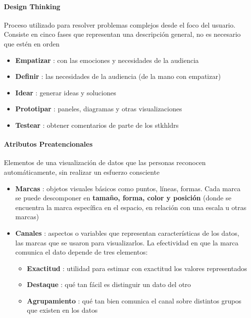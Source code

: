 \paragraph{Design Thinking}
Proceso utilizado para resolver problemas complejos desde el foco del usuario. Consiste en cinco fases que representan una descripción general, no es necesario que estén en orden
\begin{itemize}
    \item {\textbf{Empatizar} : con las emociones y necesidades de la audiencia}
    \item {\textbf{Definir} : las necesidades de la audiencia (de la mano con empatizar)}
    \item {\textbf{Idear} : generar ideas y soluciones} 
    \item {\textbf{Prototipar} : paneles, diagramas y otras visualizaciones}
    \item {\textbf{Testear} : obtener comentarios de parte de los \gls{stkhldrs}}
\end{itemize}

\paragraph{Atributos Preatencionales}
Elementos de una visualización de datos que las personas reconocen automáticamente, sin realizar un esfuerzo consciente
\begin{itemize}
    \item {\textbf{Marcas} : objetos visuales básicos como puntos, líneas, formas. Cada marca se puede descomponer en \textbf{tamaño, forma, color y posición} (donde se encuentra la marca específica en el espacio, en relación con una escala u otras marcas)}
    \item {\textbf{Canales} : aspectos o variables que representan características de los datos, las marcas que se usaron para visualizarlos. La efectividad en que la marca comunica el dato depende de tres elementos:
    \begin{itemize}
        \item {\textbf{Exactitud} : utilidad para estimar con exactitud los valores representados}
        \item {\textbf{Destaque} : qué tan fácil es distinguir un dato del otro}
        \item {\textbf{Agrupamiento} : qué tan bien comunica el canal sobre distintos grupos que existen en los datos}
    \end{itemize}}
\end{itemize}

